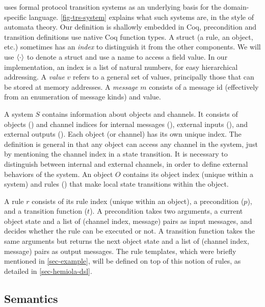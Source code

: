 \documentclass[sigplan,10pt,review,anonymous,screen]{acmart}\settopmatter{printfolios=true,printccs=false,printacmref=false}
\begin{document}
\hemiola{} uses formal protocol transition systems as an underlying basis for the domain-specific language.
\autoref{fig-trs-system} explains what such systems are, in the style of automata theory.
Our definition is shallowly embedded in Coq, \eg{} precondition and transition definitions use native Coq function types.
A struct (a rule, an object, etc.)  sometimes has an \emph{index} to distinguish it from the other components.
We will use $\langle \cdot \rangle$ to denote a struct and use a name to access a field value.
In our implementation, an index is a list of natural numbers, for easy hierarchical addressing.
A \emph{value} $v$ refers to a general set of values, principally those that can be stored at memory addresses.
A \emph{message} $m$ consists of a message id (effectively from an enumeration of message kinds) and value.

A system $S$ contains information about objects and channels.
It consists of objects () and channel indices for internal messages (), external inputs (), and external outputs ().
Each object (or channel) has its own unique index.
The definition is general in that any object can access any channel in the system, just by mentioning the channel index in a state transition.
It is necessary to distinguish between internal and external channels, in order to define external behaviors of the system.
An object $O$ contains its object index (unique within a system) and rules () that make local state transitions within the object.

A rule $r$ consists of its rule index (unique within an object), a precondition ($p$), and a transition function ($t$).
A precondition takes two arguments, a current object state and a list of (channel index, message) pairs as input messages, and decides whether the rule can be executed or not.
A transition function takes the same arguments but returns the next object state and a list of (channel index, message) pairs as output messages.
The rule templates, which were briefly mentioned in \autoref{sec-example}, will be defined on top of this notion of rules, as detailed in \autoref{sec-hemiola-dsl}.

\subsection{Semantics}
\label{sec-semantics}
\end{document}

